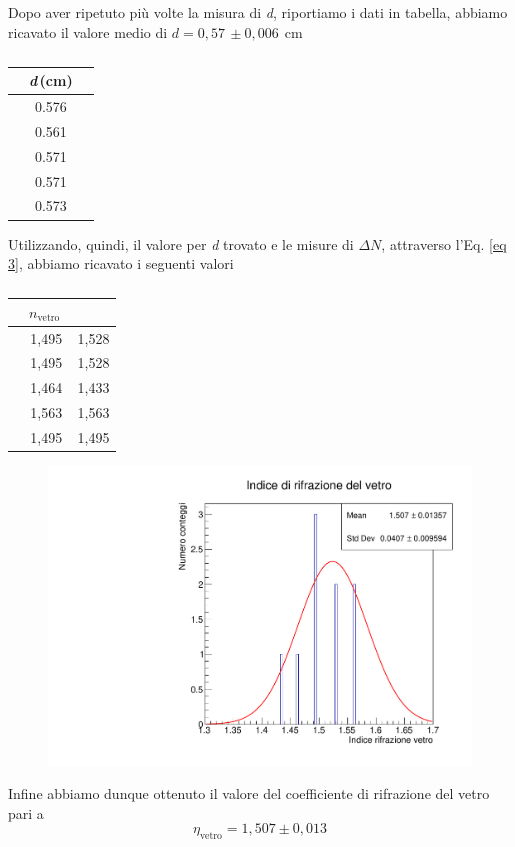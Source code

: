 Dopo aver ripetuto più volte la misura di \textit{d}, riportiamo i dati in tabella, abbiamo ricavato il valore medio di $d = 0,57\, \pm 0,006\, \operatorname{cm}$
\FloatBarrier
\begin{table}[h!]
    \centering
    \begin{tabular}{ccc}
    &\textit{d}\,(cm)\\
    \hline
         & 0.576 \\
         & 0.561 \\
         & 0.571 \\ 
         & 0.571 \\
         & 0.573 \\
    \hline\hline
    \end{tabular}
    \caption{}
\end{table}
\FloatBarrier
Utilizzando, quindi, il valore per \textit{d} trovato e le misure di $\Delta N$, attraverso l'Eq. \ref{eq 3}, abbiamo ricavato i seguenti valori

\FloatBarrier
\begin{table}[h!]
    \centering
    \begin{tabular}{ccc}
    &$n_{\text {vetro }}$ \\
    \hline
        & 1,495  & 1,528\\
        & 1,495  & 1,528\\
        & 1,464  & 1,433\\  
        & 1,563  & 1,563\\
        & 1,495  & 1,495\\
    \hline\hline
    \end{tabular}
    \caption{}
\end{table}
\FloatBarrier
\noindent
\begin{figure}[h!]
    \centering
    \includegraphics[scale=.4]{immagini/vetro copia.pdf}
    \caption{}
    \label{fig:my_label}
\end{figure}
Infine abbiamo dunque ottenuto il valore del coefficiente di rifrazione del vetro pari a 
$$
\eta_{\text{vetro}}=1,507\pm0,013
$$


